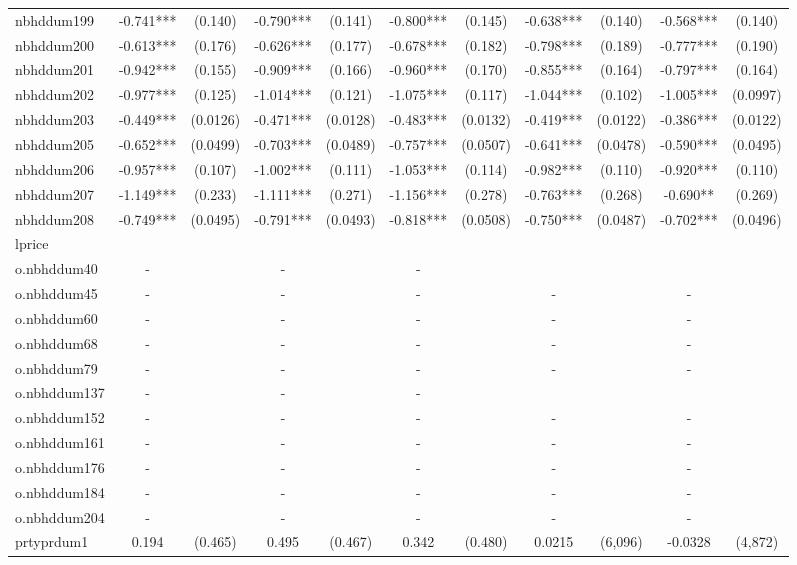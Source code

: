 \documentclass[]{article}
\begin{document}
\begin{tabular}{lcccccccccc}
nbhddum199 & -0.741*** & (0.140) & -0.790*** & (0.141) & -0.800*** & (0.145) & -0.638*** & (0.140) & -0.568*** & (0.140) \\
nbhddum200 & -0.613*** & (0.176) & -0.626*** & (0.177) & -0.678*** & (0.182) & -0.798*** & (0.189) & -0.777*** & (0.190) \\
nbhddum201 & -0.942*** & (0.155) & -0.909*** & (0.166) & -0.960*** & (0.170) & -0.855*** & (0.164) & -0.797*** & (0.164) \\
nbhddum202 & -0.977*** & (0.125) & -1.014*** & (0.121) & -1.075*** & (0.117) & -1.044*** & (0.102) & -1.005*** & (0.0997) \\
nbhddum203 & -0.449*** & (0.0126) & -0.471*** & (0.0128) & -0.483*** & (0.0132) & -0.419*** & (0.0122) & -0.386*** & (0.0122) \\
nbhddum205 & -0.652*** & (0.0499) & -0.703*** & (0.0489) & -0.757*** & (0.0507) & -0.641*** & (0.0478) & -0.590*** & (0.0495) \\
nbhddum206 & -0.957*** & (0.107) & -1.002*** & (0.111) & -1.053*** & (0.114) & -0.982*** & (0.110) & -0.920*** & (0.110) \\
nbhddum207 & -1.149*** & (0.233) & -1.111*** & (0.271) & -1.156*** & (0.278) & -0.763*** & (0.268) & -0.690** & (0.269) \\
nbhddum208 & -0.749*** & (0.0495) & -0.791*** & (0.0493) & -0.818*** & (0.0508) & -0.750*** & (0.0487) & -0.702*** & (0.0496) \\
lprice &  &  &  &  &  &  &  &  &  &  \\
o.nbhddum40 & - &  & - &  & - &  &  &  &  &  \\
o.nbhddum45 & - &  & - &  & - &  & - &  & - &  \\
o.nbhddum60 & - &  & - &  & - &  & - &  & - &  \\
o.nbhddum68 & - &  & - &  & - &  & - &  & - &  \\
o.nbhddum79 & - &  & - &  & - &  & - &  & - &  \\
o.nbhddum137 & - &  & - &  & - &  &  &  &  &  \\
o.nbhddum152 & - &  & - &  & - &  & - &  & - &  \\
o.nbhddum161 & - &  & - &  & - &  & - &  & - &  \\
o.nbhddum176 & - &  & - &  & - &  & - &  & - &  \\
o.nbhddum184 & - &  & - &  & - &  & - &  & - &  \\
o.nbhddum204 & - &  & - &  & - &  & - &  & - &  \\
prtyprdum1 & 0.194 & (0.465) & 0.495 & (0.467) & 0.342 & (0.480) & 0.0215 & (6,096) & -0.0328 & (4,872) \\

\end{tabular}
\end{document}
